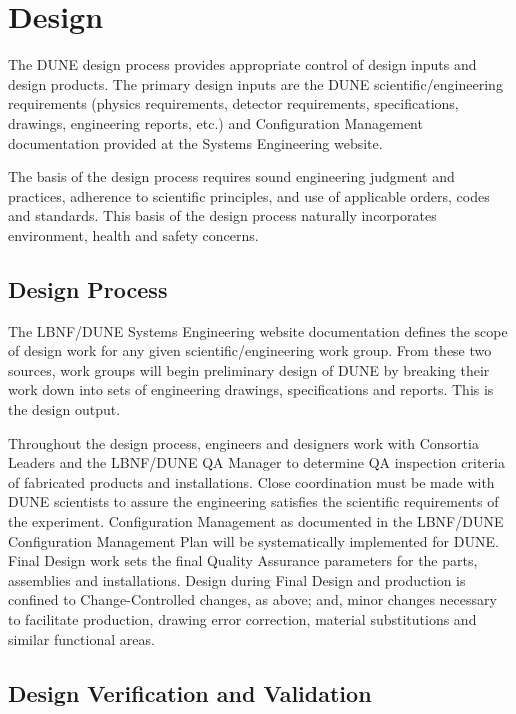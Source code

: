 \section{Design}

The DUNE design process provides appropriate control of design inputs
and design products. The primary design inputs are the DUNE
scientific/engineering requirements (physics requirements, detector
requirements, specifications, drawings, engineering reports, etc.) and
Configuration Management documentation provided at the Systems
Engineering website.

The basis of the design process requires sound engineering judgment
and practices, adherence to scientific principles, and use of
applicable orders, codes and standards. This basis of the design
process naturally incorporates environment, health and safety
concerns.

\subsection{Design Process}

The LBNF/DUNE Systems Engineering website documentation defines the
scope of design work for any given scientific/engineering work
group. From these two sources, work groups will begin preliminary
design of DUNE by breaking their work down into sets of engineering
drawings, specifications and reports. This is the design output.

Throughout the design process, engineers and designers work with
Consortia Leaders and the LBNF/DUNE QA Manager to determine QA
inspection criteria of fabricated products and installations. Close
coordination must be made with DUNE scientists to assure the
engineering satisfies the scientific requirements of the
experiment. Configuration Management as documented in the LBNF/DUNE
Configuration Management Plan will be systematically implemented for
DUNE. Final Design work sets the final Quality Assurance parameters
for the parts, assemblies and installations. Design during Final
Design and production is confined to Change-Controlled changes, as
above; and, minor changes necessary to facilitate production, drawing
error correction, material substitutions and similar functional areas.

\subsection{Design Verification and Validation}

